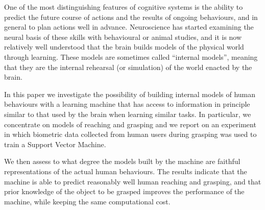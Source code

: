 One of the most distinguishing features of cognitive systems is the
ability to predict the future course of actions and the results of
ongoing behaviours, and in general to plan actions well in advance.
Neuroscience has started examining the neural basis of these skills
with behavioural or animal studies, and it is now relatively well
understood that the brain builds models of the physical world through
learning. These models are sometimes called ``internal models'',
meaning that they are the internal rehearsal (or simulation) of the
world enacted by the brain.

In this paper we investigate the possibility of building internal
models of human behaviours with a learning machine that has access to
information in principle similar to that used by the brain when
learning similar tasks. In particular, we concentrate on models of
reaching and grasping and we report on an experiment in which
biometric data collected from human users during grasping was used to
train a Support Vector Machine.

We then assess to what degree the models built by the machine are
faithful representations of the actual human behaviours. The results
indicate that the machine is able to predict reasonably well human
reaching and grasping, and that prior knowledge of the object to be
grasped improves the performance of the machine, while keeping the
same computational cost.
